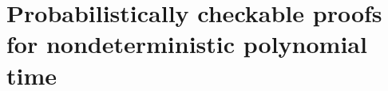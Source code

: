 


\section{Probabilistically checkable proofs for nondeterministic polynomial time}
\label{sec:dinur}

